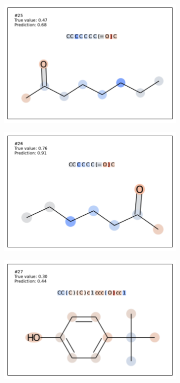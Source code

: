 \begin{figure}
\begin{subfigure}[b]{0.33\textwidth}
  \centering 
  \includegraphics[width=\textwidth]{figures/esol/esol25.pdf} 
\end{subfigure}
\begin{subfigure}[b]{0.33\textwidth} 
  \centering 
  \includegraphics[width=\textwidth]{figures/esol/esol26.pdf} 
\end{subfigure}\begin{subfigure}[b]{0.33\textwidth} 
  \centering 
  \includegraphics[width=\textwidth]{figures/esol/esol27.pdf} 

\end{subfigure}
\end{figure}
